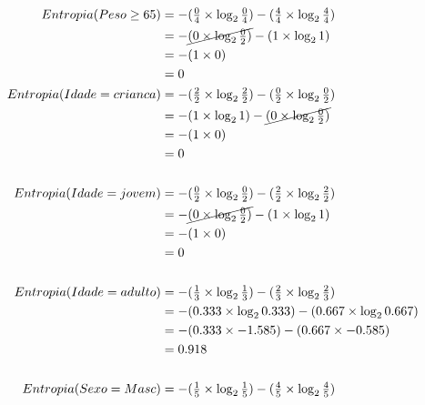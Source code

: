 \documentclass[
    article,            %
    11pt,               %
    oneside,            %
    a4paper,            %
    english,            %
    brazil,             %
    sumario=tradicional,
    ]{abntex2}
\begin{document}
\begin{align*}             
Entropia(Peso \ge65) &= - (\tfrac{0}{4} \times \log_2 \tfrac{0}{4}) - (\tfrac{4}{4} \times \log_2 \tfrac{4}{4}) \\ 
            &= - \cancel{(0 \times \log_2 \tfrac{0}{2})} - (1 \times \log_2 1)                         \\
            &= - (1 \times 0)                                                                          \\
            &= 0                                                                                     \\
Entropia(Idade = crianca) &= - (\tfrac{2}{2} \times \log_2 \tfrac{2}{2}) - (\tfrac{0}{2} \times \log_2 \tfrac{0}{2}) \\ 
            &= - (1 \times \log_2 1) - \cancel{(0 \times \log_2 \tfrac{0}{2})}                         \\
            &= - (1 \times 0)                                                                          \\
            &= 0                                                                                     \\\\
Entropia(Idade = jovem) &= - (\tfrac{0}{2} \times \log_2 \tfrac{0}{2}) - (\tfrac{2}{2} \times \log_2 \tfrac{2}{2}) \\ 
            &= - \cancel{(0 \times \log_2 \tfrac{0}{2})} - (1 \times \log_2 1)                         \\
            &= - (1 \times 0)                                                                          \\
            &= 0                                                                                     \\\\
Entropia(Idade=adulto) &= - (\tfrac{1}{3} \times \log_2 \tfrac{1}{3}) - (\tfrac{2}{3} \times \log_2 \tfrac{2}{3}) \\ 
            &= - (0.333 \times \log_2 0.333) - (0.667 \times \log_2 0.667)                             \\
            &= - (0.333 \times -1.585) - (0.667 \times -0.585)                                         \\
            &= 0.918                                                                                 \\\\
Entropia(Sexo=Masc) &= - (\tfrac{1}{5} \times \log_2 \tfrac{1}{5}) - (\tfrac{4}{5} \times \log_2 \tfrac{4}{5}) \\ 

\end{align*}
\end{document}
